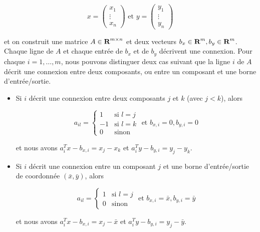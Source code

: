 \begin{enumerate}
    $$x=
    \left(
    \begin{array}{c}
      x_1\\
      \vdots\\
      x_n
    \end{array}
    \right)
    \mbox{ et }
    y=
    \left(
    \begin{array}{c}
      y_1\\
      \vdots\\
      y_n
    \end{array}
    \right)
    $$



    et on construit une matrice $A \in {\mbox{\bf R}}^{m \times n}$ et deux vecteurs $b_x \in {\mbox{\bf R}}^m, b_y \in {\mbox{\bf R}}^m$.
    Chaque ligne de
    $A$ et chaque entrée de $b_x$ et de $b_y$ décrivent une connexion. Pour chaque $i=1, \ldots, m$, nous pouvons distinguer deux cas
    suivant que la ligne $i$ de $A$ décrit une connexion entre deux composants, ou entre un composant et une borne d'entrée/sortie.
    \begin{itemize}
      \item Si $i$ décrit une connexion entre deux composants $j$ et $k$ (avec $j < k$), alors

        $$a_{il}=
        \left\{
          \begin{array}{rl}
            1 & \mbox{si } l=j\\
            -1 & \mbox{si } l=k\\
            0 & \mbox{sinon}
          \end{array}
        \right.
        \mbox{ et }
        b_{x, i}=0, b_{y,i}=0
        $$

        et nous avons  $a_i^Tx-b_{x,i}=x_j-x_k$ et $a_i^Ty-b_{y,i}=y_j-y_k.$

      \item Si $i$ décrit une connexion entre un composant $j$ et une borne d'entrée/sortie de coordonnée $(\bar x, \bar y)$, alors

        $$a_{il}=
        \left\{
          \begin{array}{rll}
            1 & \mbox{si } l=j\\
            0 & \mbox{sinon}
          \end{array}
        \right.
        \mbox{ et }
        b_{x, i}=\bar x, b_{y,i}=\bar y
        $$

        et nous avons $a_i^Tx-b_{x,i}=x_j-\bar x$ et $a_i^Ty-b_{y,i}=y_j-\bar y.$

    \end{itemize}


\end{enumerate}
